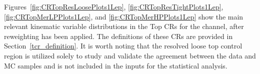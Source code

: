 \label{subsec:top_cr}

Figures~\ref{fig:CRTopResLoosePlots1Lep}, \ref{fig:CRTopResTightPlots1Lep}, \ref{fig:CRTopMerLPPlots1Lep}, and \ref{fig:CRTopMerHPPlots1Lep} show the main relevant kinematic variable distributions in the Top CRs for the \olep channel, after \mjjtag reweighting has been applied.
The definitions of these CRs are provided in Section~\ref{tcr_definition}. It is worth noting that the resolved loose top control region is utilized solely to study and validate the agreement between the data and MC samples and is not included in the inputs for the statistical analysis.

